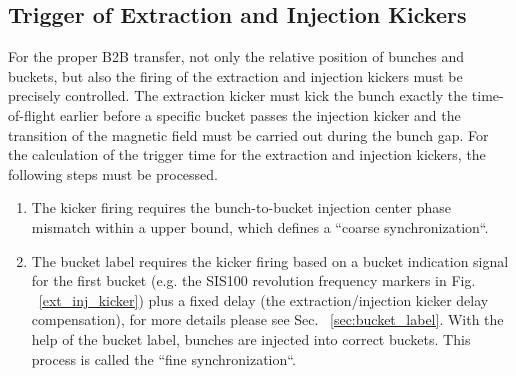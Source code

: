 \subsection{Trigger of Extraction and Injection Kickers}
\label{sec:compensation}
For the proper B2B transfer, not only the relative position of bunches and buckets, but also the firing of the extraction and injection kickers must be precisely controlled. The extraction kicker must kick the bunch exactly the time-of-flight earlier before a specific bucket passes the injection kicker and the transition of the magnetic field must be carried out during the bunch gap. For the calculation of the trigger time for the extraction and injection kickers, the following steps must be processed. 
\begin{enumerate}
\item The kicker firing requires the bunch-to-bucket injection center phase mismatch within a upper bound, which defines a ``coarse synchronization``.
\item The bucket label requires the kicker firing based on a bucket indication signal for the first bucket (e.g. the SIS100 revolution frequency markers in Fig. ~\ref{ext_inj_kicker}) plus a
fixed delay (the extraction/injection kicker delay compensation), for more details please see Sec. ~\ref{sec:bucket_label}. With the help of the bucket label, bunches are injected into correct buckets. This process is called the ``fine synchronization``.
\end{enumerate}


